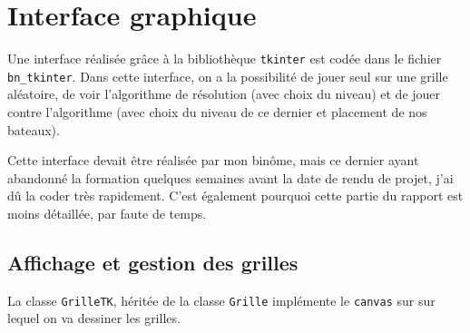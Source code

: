 \chapter{Interface graphique}

Une interface réalisée grâce à la bibliothèque \texttt{tkinter} est codée dans le fichier \texttt{bn\_tkinter}. Dans cette interface, on a la possibilité de jouer seul sur une grille aléatoire, de voir l'algorithme de résolution (avec choix du niveau) et de jouer contre l'algorithme (avec choix du niveau de ce dernier et placement de nos bateaux).

Cette interface devait être réalisée par mon binôme, mais ce dernier ayant abandonné la formation quelques semaines avant la date de rendu de projet, j'ai dû la coder très rapidement. C'est également pourquoi cette partie du rapport est moins détaillée, par faute de temps.

%
%
%
%
%
%

\section{Affichage et gestion des grilles}
La classe \texttt{GrilleTK}, héritée de la classe \texttt{Grille} implémente le \texttt{canvas} sur sur lequel on va dessiner les grilles.

